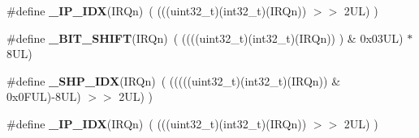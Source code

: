 \begin{DoxyCompactItemize}
\item 
\hypertarget{group___c_m_s_i_s___core___n_v_i_c_functions_ga370ec4b1751a6a889d849747df3763a9}{\#define {\bfseries \-\_\-\-I\-P\-\_\-\-I\-D\-X}(I\-R\-Qn)~(   (((uint32\-\_\-t)(int32\-\_\-t)(I\-R\-Qn))                $>$$>$    2\-U\-L)      )}\label{group___c_m_s_i_s___core___n_v_i_c_functions_ga370ec4b1751a6a889d849747df3763a9}

\item 
\hypertarget{group___c_m_s_i_s___core___n_v_i_c_functions_ga53c75b28823441c6153269f0ecbed878}{\#define {\bfseries \-\_\-\-B\-I\-T\-\_\-\-S\-H\-I\-F\-T}(I\-R\-Qn)~(  ((((uint32\-\_\-t)(int32\-\_\-t)(I\-R\-Qn))         )      \&  0x03\-U\-L) $\ast$ 8\-U\-L)}\label{group___c_m_s_i_s___core___n_v_i_c_functions_ga53c75b28823441c6153269f0ecbed878}

\item 
\hypertarget{group___c_m_s_i_s___core___n_v_i_c_functions_gaee4f7eb5d7e770ad51489dbceabb1755}{\#define {\bfseries \-\_\-\-S\-H\-P\-\_\-\-I\-D\-X}(I\-R\-Qn)~( (((((uint32\-\_\-t)(int32\-\_\-t)(I\-R\-Qn)) \& 0x0\-F\-U\-L)-\/8\-U\-L) $>$$>$    2\-U\-L)      )}\label{group___c_m_s_i_s___core___n_v_i_c_functions_gaee4f7eb5d7e770ad51489dbceabb1755}

\item 
\hypertarget{group___c_m_s_i_s___core___n_v_i_c_functions_ga370ec4b1751a6a889d849747df3763a9}{\#define {\bfseries \-\_\-\-I\-P\-\_\-\-I\-D\-X}(I\-R\-Qn)~(   (((uint32\-\_\-t)(int32\-\_\-t)(I\-R\-Qn))                $>$$>$    2\-U\-L)      )}\label{group___c_m_s_i_s___core___n_v_i_c_functions_ga370ec4b1751a6a889d849747df3763a9}

\end{DoxyCompactItemize}

